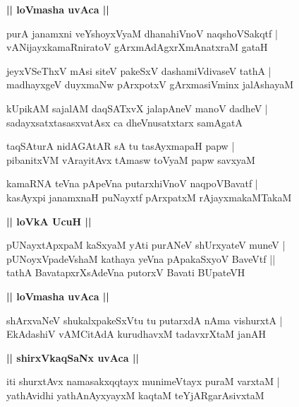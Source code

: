 \documentclass[twoside,12pt,openright]{book}
\newcounter{shloka}[chapter]
\def\uvaca#1{\centerline{{\large\textbf{#1}}}}
\begin{document}
\uvaca{|| loVmasha uvAca ||}

\begin{shloka}%
purA janamxni veYshoyxVyaM dhanahiVnoV naqshoVSakqtf |\\
vANijayxkamaRniratoV gArxmAdAgxrXmAnatxraM gataH 
\end{shloka}

\begin{shloka}%
jeyxVSeThxV mAsi siteV pakeSxV dashamiVdivaseV tathA |\\
madhayxgeV duyxmaNw pArxpotxV gArxmasiVminx jalAshayaM 
\end{shloka}

\begin{shloka}%
kUpikAM sajalAM daqSATxvX jalapAneV manoV dadheV |\\
sadayxsatxtasasxvatAsx ca dheVnusatxtarx samAgatA
\end{shloka}

\begin{shloka}%
taqSAturA nidAGAtAR sA tu tasAyxmapaH papw |\\
pibanitxVM vArayitAvx tAmasw toVyaM papw savxyaM 
\end{shloka}

\begin{shloka}%
kamaRNA teVna pApeVna putarxhiVnoV naqpoVBavatf |\\
kasAyxpi janamxnaH puNayxtf pArxpatxM rAjayxmakaMTakaM 
\end{shloka}

\uvaca{|| loVkA UcuH ||}

\begin{shloka}%
pUNayxtApxpaM kaSxyaM yAti purANeV shUrxyateV muneV |\\
pUNoyxVpadeVshaM kathaya yeVna pApakaSxyoV BaveVtf ||\\
tathA BavatapxrXsAdeVna putorxV Bavati BUpateVH
\end{shloka}

\uvaca{|| loVmasha uvAca ||}

\begin{shloka}%
shArxvaNeV shukalxpakeSxVtu tu putarxdA nAma vishurxtA |\\
EkAdashiV vAMCitAdA kurudhavxM tadavxrXtaM janAH
\end{shloka}

\uvaca{|| shirxVkaqSaNx uvAca ||}

\begin{shloka}%
iti shurxtAvx namasakxqqtayx munimeVtayx puraM varxtaM |\\
yathAvidhi yathAnAyxyayxM kaqtaM teYjARgarAsivxtaM 
\end{shloka}
\end{document}

